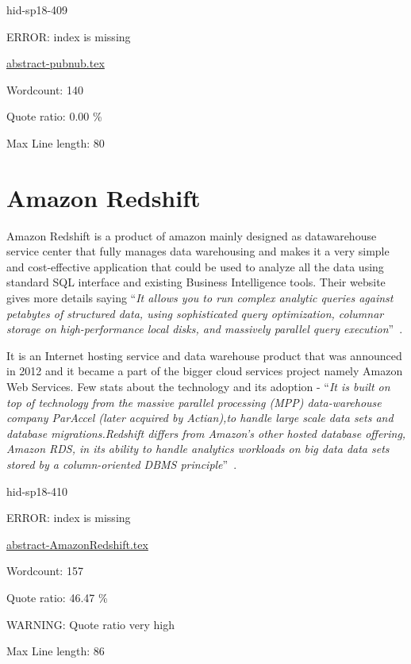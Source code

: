 \begin{IU}

hid-sp18-409

ERROR: index is missing

\href{https://github.com/cloudmesh-community/hid-sp18-409/blob/master//technology/abstract-pubnub.tex}{abstract-pubnub.tex}

 

Wordcount: 140


Quote ratio: 0.00 \%
 
Max Line length: 80
\end{IU}

\section{Amazon Redshift}

Amazon Redshift is a product of amazon mainly designed as
datawarehouse service center that fully manages data warehousing and
makes it a very simple and cost-effective application that could be
used to analyze all the data using standard SQL interface and existing
Business Intelligence tools.  Their website gives more details saying
\color{blue}``\emph{It allows you to run complex analytic queries against petabytes of
structured data, using sophisticated query optimization, columnar
storage on high-performance local disks, and massively parallel query
execution}''\color{black}~\cite{hid-sp18-410-Amazon-Redshift}.

It is an Internet hosting service and data warehouse product that was
announced in 2012 and it became a part of the bigger cloud services
project namely Amazon Web Services. Few stats about the technology and
its adoption - \color{blue}``\emph{It is built on top of technology from the massive
parallel processing (MPP) data-warehouse company ParAccel (later
acquired by Actian),to handle large scale data sets and database
migrations.Redshift differs from Amazon's other hosted database
offering, Amazon RDS, in its ability to handle analytics workloads on
big data data sets stored by a column-oriented DBMS
principle}''\color{black}~\cite{hid-sp18-410-AmazonWiki}.



\begin{IU}

hid-sp18-410

ERROR: index is missing

\href{https://github.com/cloudmesh-community/hid-sp18-410/blob/master//technology/abstract-AmazonRedshift.tex}{abstract-AmazonRedshift.tex}

 

Wordcount: 157


Quote ratio: 46.47 \%

WARNING: Quote ratio very high
 
Max Line length: 86
\end{IU}


